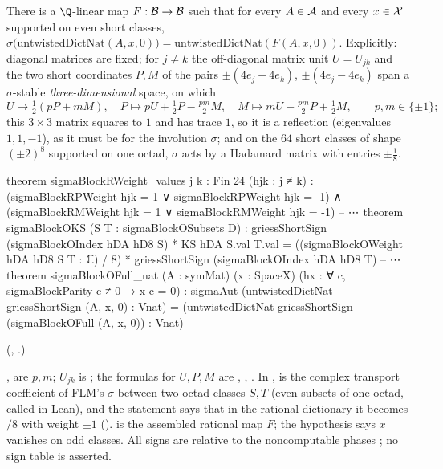 \begin{theorem}\label{ch22:thm:sigmaeven}
There is a $\Q$-linear map $F:\mathcal{B}\to\mathcal{B}$ such that for every $A\in\mathcal{A}$ and every $x\in\mathcal{X}$
supported on even short classes,
$\sigma\bigl(\mathrm{untwistedDictNat}(A,x,0)\bigr)=\mathrm{untwistedDictNat}(F(A,x,0))$.  Explicitly: diagonal matrices are
fixed; for $j\ne k$ the off-diagonal matrix unit $U=U_{jk}$ and the two short coordinates $P,M$ of the pairs
$\pm(4e_j+4e_k)$, $\pm(4e_j-4e_k)$ span a $\sigma$-stable \emph{three-dimensional} space, on which
\begin{equation*}
  U\mapsto\tfrac12(pP+mM),\quad P\mapsto pU+\tfrac12P-\tfrac{pm}2M,\quad M\mapsto mU-\tfrac{pm}2P+\tfrac12M,\qquad
  p,m\in\{\pm1\};
\end{equation*}
this $3\times3$ matrix squares to $1$ and has trace $1$, so it is a reflection (eigenvalues $1,1,-1$), as it must be for the
involution $\sigma$;
and on the $64$ short classes of shape $(\pm2)^8$ supported on one octad, $\sigma$ acts by a Hadamard matrix with entries
$\pm\tfrac18$.
\end{theorem}
\begin{leancode}
theorem sigmaBlockRWeight_values {j k : Fin 24} (hjk : j ≠ k) :
    (sigmaBlockRPWeight hjk = 1 ∨ sigmaBlockRPWeight hjk = -1) ∧
      (sigmaBlockRMWeight hjk = 1 ∨ sigmaBlockRMWeight hjk = -1)
-- ⋯
theorem sigmaBlockOKS (S T : sigmaBlockOSubsets D) :
    griessShortSign (sigmaBlockOIndex hDA hD8 S) * KS hDA S.val T.val =
      ((sigmaBlockOWeight hDA hD8 S T : ℂ) / 8) *
        griessShortSign (sigmaBlockOIndex hDA hD8 T)
-- ⋯
theorem sigmaBlockOFull_nat (A : symMat) (x : SpaceX)
    (hx : ∀ c, sigmaBlockParity c ≠ 0 → x c = 0) :
    sigmaAut (untwistedDictNat griessShortSign (A, x, 0) : Vnat) =
      (untwistedDictNat griessShortSign (sigmaBlockOFull (A, x, 0)) : Vnat)
\end{leancode}
(, .)
\begin{dictionary}
,  are $p,m$; $U_{jk}$ is ; the formulas for $U,P,M$ are
, , .  In ,  is the
complex transport coefficient of FLM's $\sigma$ between two octad classes $S,T$ (even subsets of one octad, called  in Lean), and the
statement says that in the rational dictionary it becomes $/8$ with weight $\pm1$
().   is the assembled rational map $F$; the hypothesis 
says $x$ vanishes on odd classes.  All signs are relative to the noncomputable phases ; no sign
table is asserted.
\end{dictionary}
